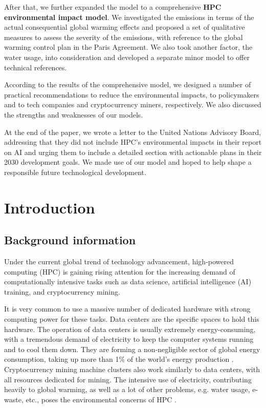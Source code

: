\documentclass[12pt]{article}
\begin{document}
After that, we further expanded the model to a comprehensive \textbf{HPC environmental impact model}. We investigated the  emissions in terms of the actual consequential global warming effects and proposed a set of qualitative measures to assess the severity of the emissions, with reference to the global warming control plan in the Paris Agreement. We also took another factor, the water usage, into consideration and developed a separate minor model to offer technical references.

According to the results of the comprehensive model, we designed a number of practical recommendations to reduce the environmental impacts, to policymakers and to tech companies and cryptocurrency miners, respectively. We also discussed the strengths and weaknesses of our models.

At the end of the paper, we wrote a letter to the United Nations Advisory Board, addressing that they did not include HPC's environmental impacts in their report on AI and urging them to include a detailed section with actionable plans in their 2030 development goals. We made use of our model and hoped to help shape a responsible future technological development.

\newpage

{\center\tableofcontents}

\newpage

\section{Introduction}

\subsection{Background information}

Under the current global trend of technology advancement, high-powered computing (HPC) is gaining rising attention for the increasing demand of computationally intensive tasks such as data science, artificial intelligence (AI) training, and cryptocurrency mining.

It is very common to use a massive number of dedicated hardware with strong computing power for these tasks. Data centers are the specific spaces to hold this hardware. The operation of data centers is usually extremely energy-consuming, with a tremendous demand of electricity to keep the computer systems running and to cool them down. They are forming a non-negligible sector of global energy consumption, taking up more than 1\% of the world's energy production \citep{IEA2024}. Cryptocurrency mining machine clusters also work similarly to data centers, with all resources dedicated for mining. The intensive use of electricity, contributing heavily to global warming, as well as a lot of other problems, e.g. water usage, e-waste, etc., poses the environmental concerns of HPC \citep{digiconomist}.
\end{document}
